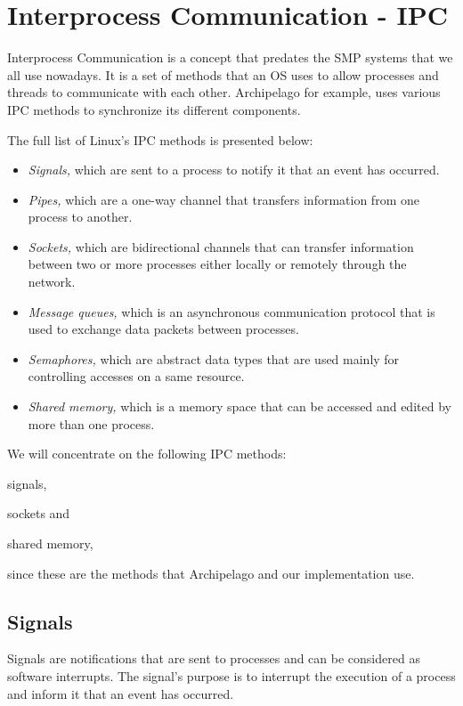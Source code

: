\section{Interprocess Communication - IPC}\label{sec:ipc-theory}

Interprocess Communication is a concept that predates the SMP systems that we 
all use nowadays. It is a set of methods that an OS uses to allow processes and 
threads to communicate with each other. Archipelago for example, uses various 
IPC methods to synchronize its different components.

The full list of Linux's IPC methods is presented below:

\begin{itemize}
	\item \textit{Signals,} which are sent to a process to notify it that 
		an event has occurred.
	\item \textit{Pipes,} which are a one-way channel that transfers 
		information from one process to another.
	\item \textit{Sockets,} which are bidirectional channels that can 
		transfer information between two or more processes either 
		locally or remotely through the network.
	\item \textit{Message queues,} which is an asynchronous communication 
		protocol that is used to exchange data packets between 
		processes.
	\item \textit{Semaphores,} which are abstract data types that are used 
		mainly for controlling accesses on a same resource.
	\item \textit{Shared memory,} which is a memory space that can be 
		accessed and edited by more than one process.
\end{itemize}

We will concentrate on the following IPC methods:
\begin{inparaenum}[i)]
\item signals,
\item sockets and
\item shared memory,
\end{inparaenum}
since these are the methods that Archipelago and our implementation use.

\subsection{Signals}

Signals are notifications that are sent to processes and can be considered as 
software interrupts. The signal's purpose is to interrupt the execution of a
process and inform it that an event has occurred.


